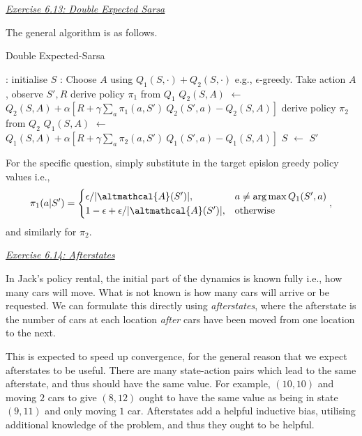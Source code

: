 \documentclass{article}
\newcommand{\myq}[1]{%
	\vspace{1em}
	\noindent\underline{\emph{Exercise #1}}\vspace{0.25em}\linebreak
}
\newcommand*\Let[2]{\State #1 $\gets$ #2}
\begin{document}
\myq{6.13: Double Expected Sarsa}
The general algorithm is as follows. 
\begin{algorithm}[H]
	\caption{Double Expected-Sarsa
		\label{alg:double expected sarsa}}
	\begin{algorithmic}[1]
		\Require{
			\textbf{Parameters:} \Statex \hspace{\algorithmicindent} step size $\alpha \in (0, 1]$
			\Statex \hspace{\algorithmicindent} small $\epsilon > 0$ 
		}
		\Statex 
		\Statex
		: 
		\State initialise $S$
		:
		\State Choose $A$ using $Q_1(S, \cdot) + Q_2(S, \cdot)$ e.g., $\epsilon$-greedy. 
		\State Take action $A$, observe $S', R$
			\State derive policy $\pi_1$ from $Q_1$
			\Let{$Q_2(S, A)$}{$Q_2(S, A) + \alpha [R + \gamma \sum_{a} \pi_1(a, S')\ Q_2(S', a) - Q_2(S, A)]$}
		\Else
				\State derive policy $\pi_2$ from $Q_2$
				\Let{$Q_1(S, A)$}{$Q_1(S, A) + \alpha [R + \gamma \sum_{a} \pi_2(a, S')\ Q_1(S', a) - Q_1(S, A)]$}
		\EndIf	
		\Let{$S$}{$S'$}
		\EndLoop
		\EndLoop
	\end{algorithmic}
\end{algorithm}
For the specific question, simply substitute in the target epislon greedy policy values i.e., 
\begin{align}
\pi_1(a | S') = \begin{cases}
{\epsilon}/|\altmathcal{A}(S')|,\quad & a \neq \arg\max Q_1(S', a) \\
1 - \epsilon + {\epsilon}/|\altmathcal{A}(S')| , &\text{otherwise}
\end{cases},
\end{align}
and similarly for $\pi_2$. 

\myq{6.14: Afterstates}
In Jack's policy rental, the initial part of the dynamics is known fully i.e., how many cars will move. What is not known is how many cars will arrive or be requested. We can formulate this directly using \emph{afterstates}, where the afterstate is the number of cars at each location \emph{after} cars have been moved from one location to the next. 

This is expected to speed up convergence, for the general reason that we expect afterstates to be useful. There are many state-action pairs which lead to the same afterstate, and thus should have the same value. For example, $(10, 10)$ and moving $2$ cars to give $(8, 12)$ ought to have the same value as being in state $(9, 11)$ and only moving $1$ car. Afterstates add a helpful inductive bias, utilising additional knowledge of the problem, and thus they ought to be helpful. 
\end{document}
